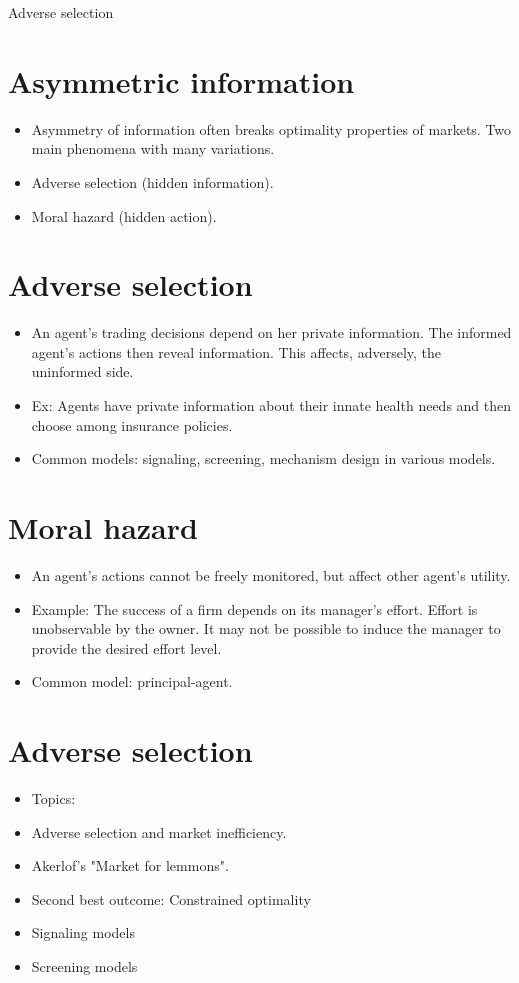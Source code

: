 \documentclass[10pt]{article}
\begin{document}
Adverse selection

\section*{Asymmetric information}
\begin{itemize}
  \item Asymmetry of information often breaks optimality properties of markets. Two main phenomena with many variations.
  \item Adverse selection (hidden information).
  \item Moral hazard (hidden action).
\end{itemize}

\section*{Adverse selection}
\begin{itemize}
  \item An agent's trading decisions depend on her private information. The informed agent's actions then reveal information. This affects, adversely, the uninformed side.
  \item Ex: Agents have private information about their innate health needs and then choose among insurance policies.
  \item Common models: signaling, screening, mechanism design in various models.
\end{itemize}

\section*{Moral hazard}
\begin{itemize}
  \item An agent's actions cannot be freely monitored, but affect other agent's utility.
  \item Example: The success of a firm depends on its manager's effort. Effort is unobservable by the owner. It may not be possible to induce the manager to provide the desired effort level.
  \item Common model: principal-agent.
\end{itemize}

\section*{Adverse selection}
\begin{itemize}
  \item Topics:
  \item Adverse selection and market inefficiency.
  \item Akerlof's "Market for lemmons".
  \item Second best outcome: Constrained optimality
  \item Signaling models
  \item Screening models
\end{itemize}
\end{document}
